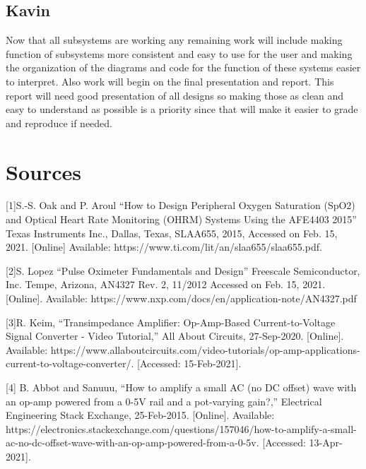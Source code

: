 \documentclass{article}
\begin{document}
\subsection{Kavin}
Now that all subsystems are working any remaining work will include making function of subsystems more consistent and easy to use for the user and making the organization of the diagrams and code for the function of these systems easier to interpret. Also work will begin on the final presentation and report. This report will need good presentation of all designs so making those as clean and easy to understand as possible is a priority since that will make it easier to grade and reproduce if needed.
\newpage
\section{Sources}
    [1]S.-S. Oak and P. Aroul “How to Design Peripheral Oxygen Saturation (SpO2) and Optical Heart Rate Monitoring (OHRM) Systems Using the AFE4403 2015” Texas Instruments Inc., Dallas, Texas, SLAA655, 2015, Accessed on Feb. 15, 2021. [Online] Available: https://www.ti.com/lit/an/slaa655/slaa655.pdf.
    
    [2]S. Lopez “Pulse Oximeter Fundamentals and Design” Freescale Semiconductor, Inc. Tempe, Arizona, AN4327 Rev. 2, 11/2012 Accessed on Feb. 15, 2021. [Online]. Available: https://www.nxp.com/docs/en/application-note/AN4327.pdf
    
    [3]R. Keim, “Transimpedance Amplifier: Op-Amp-Based Current-to-Voltage Signal Converter - Video Tutorial,” All About Circuits, 27-Sep-2020. [Online]. Available: https://www.allaboutcircuits.com/video-tutorials/op-amp-applications-current-to-voltage-converter/. [Accessed: 15-Feb-2021].
    
    [4] B. Abbot and Sanuuu, “How to amplify a small AC (no DC offset) wave with an op-amp powered from a 0-5V rail and a pot-varying gain?,” Electrical Engineering Stack Exchange, 25-Feb-2015. [Online]. Available: https://electronics.stackexchange.com/questions/157046/how-to-amplify-a-small-ac-no-dc-offset-wave-with-an-op-amp-powered-from-a-0-5v. [Accessed: 13-Apr-2021]. 
\end{document}

